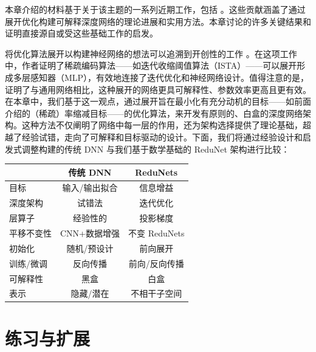 \documentclass[../../book-main.tex]{subfiles}
\begin{document}
本章介绍的材料基于关于该主题的一系列近期工作，包括 \cite{chan2021redunet, wang2024global, wang2025attention, wu2025token, yu2023white}。这些贡献涵盖了通过展开优化构建可解释深度网络的理论进展和实用方法。本章讨论的许多关键结果和证明直接源自或受这些基础工作的启发。


将优化算法展开以构建神经网络的想法可以追溯到开创性的工作 \cite{gregor2010learning}。在这项工作中，作者证明了稀疏编码算法——如迭代收缩阈值算法（ISTA）——可以展开形成多层感知器（MLP），有效地连接了迭代优化和神经网络设计。值得注意的是，\cite{monga2019algorithm} 证明了与通用网络相比，这种展开的网络更具可解释性、参数效率更高且更有效。在本章中，我们基于这一观点，通过展开旨在最小化有充分动机的目标——如前面介绍的（稀疏）率缩减目标——的优化算法，来开发有原则的、白盒的深度网络架构。这种方法不仅阐明了网络中每一层的作用，还为架构选择提供了理论基础，超越了经验试错，走向了可解释和目标驱动的设计。下面，我们将通过经验设计和启发式调整构建的传统 DNN 与我们基于数学基础的 ReduNet 架构进行比较：

\begin{center}
\begin{tabular}{| l || c | c |}
\hline
  & 传统 DNN & ReduNets\\ [0.5ex]
  \hline \hline
目标 & 输入/输出拟合 & 信息增益\\ [0.5ex]
  \hline
深度架构 & 试错法 & 迭代优化 \\  [0.5ex]
\hline
层算子 & 经验性的 & 投影梯度 \\  [0.5ex]
\hline
平移不变性 & CNN+数据增强 & 不变 ReduNets \\  [0.5ex]
\hline
初始化 & 随机/预设计 & 前向展开 \\ [0.5ex]
\hline
训练/微调 & 反向传播 & 前向/反向传播\\ [0.5ex]
\hline
可解释性 & 黑盒 & 白盒 \\ [0.5ex]
\hline
表示 & 隐藏/潜在 & 不相干子空间 \\ [0.5ex]
\hline
\end{tabular}
\end{center}




\section{练习与扩展}
\end{document}
